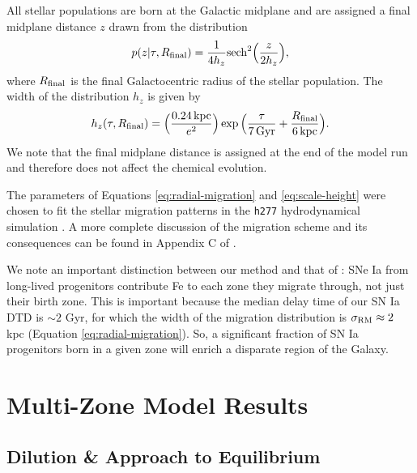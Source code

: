 \documentclass[twocolumn,twocolappendix,linenumbers]{aastex631}
\newcommand{\kpc}{\,{\rm kpc}}
\begin{document}
All stellar populations are born at the Galactic midplane and are assigned a final midplane distance $z$ drawn from the distribution
\begin{equation}
    p(z|\tau,R_{\rm final}) = \frac{1}{4 h_z} {\rm sech}^2\Big(\frac{z}{2 h_z}\Big),
    \label{eq:sech-pdf}
\end{equation}
where $R_{\rm final}$ is the final Galactocentric radius of the stellar population. The width of the distribution $h_z$ is given by
\begin{equation}
    h_z(\tau,R_{\rm final}) = \Big(\frac{0.24\kpc}{e^2}\Big) \exp\Big(\frac{\tau}{7\,{\rm Gyr}} + \frac{R_{\rm final}}{6\kpc}\Big).
    \label{eq:scale-height}
\end{equation}
We note that the final midplane distance is assigned at the end of the model run and therefore does not affect the chemical evolution.

The parameters of Equations \ref{eq:radial-migration} and \ref{eq:scale-height} were chosen to fit the stellar migration patterns in the {\tt h277} hydrodynamical simulation \citep{christensen_implementing_2012}. A more complete discussion of the migration scheme and its consequences can be found in Appendix C of \citet{dubay_galactic_2024}.

We note an important distinction between our method and that of \citet{spitoni_effect_2015}: SNe Ia from long-lived progenitors contribute Fe to each zone they migrate through, not just their birth zone. This is important because the median delay time of our SN Ia DTD is $\sim2$ Gyr, for which the width of the migration distribution is $\sigma_{\rm RM}\approx2$ kpc (Equation \ref{eq:radial-migration}). So, a significant fraction of SN Ia progenitors born in a given zone will enrich a disparate region of the Galaxy.

\section{Multi-Zone Model Results}
\label{sec:multizone-results}

\subsection{Dilution \& Approach to Equilibrium}
\label{sec:age-abundance}
\end{document}
